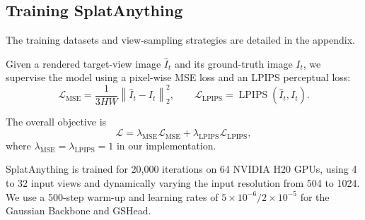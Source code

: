 



\subsection{Training SplatAnything}
\label{sec:training}
The training datasets and view-sampling strategies are detailed in the
appendix.

Given a rendered target-view image $\hat{I}_t$ and its ground-truth
image $I_t$, we supervise the model using a pixel-wise MSE loss and an
LPIPS perceptual loss:
\begin{equation}
    \mathcal{L}_{\mathrm{MSE}}
    =
    \frac{1}{3HW}
    \left\|
        \hat{I}_t-I_t
    \right\|_2^2,
    \qquad
    \mathcal{L}_{\mathrm{LPIPS}}
    =
    \operatorname{LPIPS}
    \left(
        \hat{I}_t,I_t
    \right).
\end{equation}

The overall objective is
\begin{equation}
    \mathcal{L}
    =
    \lambda_{\mathrm{MSE}}
    \mathcal{L}_{\mathrm{MSE}}
    +
    \lambda_{\mathrm{LPIPS}}
    \mathcal{L}_{\mathrm{LPIPS}},
\end{equation}
where
$\lambda_{\mathrm{MSE}}=\lambda_{\mathrm{LPIPS}}=1$
in our implementation.

SplatAnything is trained for 20,000 iterations on 64 NVIDIA H20 GPUs,
using 4 to 32 input views and dynamically varying the input resolution
from 504 to 1024. We use a 500-step warm-up and learning rates of
$5\times10^{-6}/2\times10^{-5}$ for the
Gaussian Backbone and GSHead.
